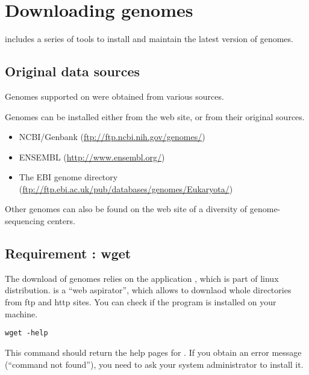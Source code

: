 
\section{Downloading genomes}
\label{downloading_genomes}

\RSAT includes a series of tools to install and maintain the latest
version of genomes.

\subsection{Original data sources}

Genomes supported on \RSAT were obtained from various sources.

Genomes can be installed either from the \RSAT web site, or from their
original sources.  

\begin{itemize}
\item NCBI/Genbank (\url{ftp://ftp.ncbi.nih.gov/genomes/})

\item ENSEMBL (\url{http://www.ensembl.org/})

\item The EBI genome directory (\url{ftp://ftp.ebi.ac.uk/pub/databases/genomes/Eukaryota/})

\end{itemize}

Other genomes can also be found on the web site of a diversity of
genome-sequencing centers.

\subsection{Requirement : wget}

The download of genomes relies on the application ,
which is part of linux distribution.  is a ``web
aspirator'', which allows to downlaod whole directories from ftp and
http sites. You can check if the program is installed on your machine.

\begin{verbatim}
wget -help
\end{verbatim}

This command should return the help pages for .  If you
obtain an error message (``command not found''), you need to ask your
system administrator to install it.

